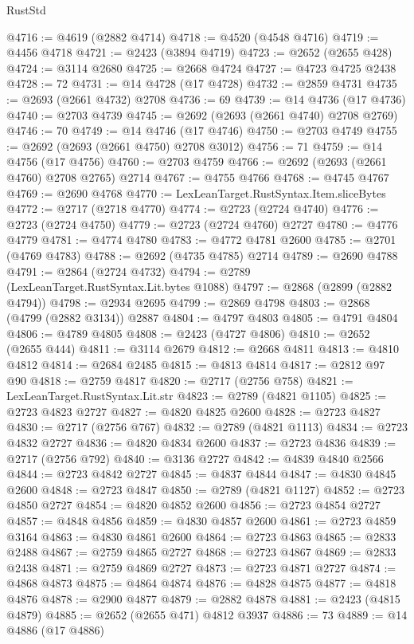 \begin{lexlean}{RustStd}
\begin{coremodule}
@4716 := @4619 (@2882 @4714)
@4718 := @4520 (@4548 @4716)
@4719 := @4456 @4718
@4721 := @2423 (@3894 @4719)
@4723 := @2652 (@2655 @428)
@4724 := @3114 @2680
@4725 := @2668 @4724
@4727 := @4723 @4725 @2438
@4728 := 72
@4731 := @14 @4728 (@17 @4728)
@4732 := @2859 @4731
@4735 := @2693 (@2661 @4732) @2708
@4736 := 69
@4739 := @14 @4736 (@17 @4736)
@4740 := @2703 @4739
@4745 := @2692 (@2693 (@2661 @4740) @2708 @2769)
@4746 := 70
@4749 := @14 @4746 (@17 @4746)
@4750 := @2703 @4749
@4755 := @2692 (@2693 (@2661 @4750) @2708 @3012)
@4756 := 71
@4759 := @14 @4756 (@17 @4756)
@4760 := @2703 @4759
@4766 := @2692 (@2693 (@2661 @4760) @2708 @2765) @2714
@4767 := @4755 @4766
@4768 := @4745 @4767
@4769 := @2690 @4768
@4770 := LexLeanTarget.RustSyntax.Item.sliceBytes
@4772 := @2717 (@2718 @4770)
@4774 := @2723 (@2724 @4740)
@4776 := @2723 (@2724 @4750)
@4779 := @2723 (@2724 @4760) @2727
@4780 := @4776 @4779
@4781 := @4774 @4780
@4783 := @4772 @4781 @2600
@4785 := @2701 (@4769 @4783)
@4788 := @2692 (@4735 @4785) @2714
@4789 := @2690 @4788
@4791 := @2864 (@2724 @4732)
@4794 := @2789 (LexLeanTarget.RustSyntax.Lit.bytes @1088)
@4797 := @2868 (@2899 (@2882 @4794))
@4798 := @2934 @2695
@4799 := @2869 @4798
@4803 := @2868 (@4799 (@2882 @3134)) @2887
@4804 := @4797 @4803
@4805 := @4791 @4804
@4806 := @4789 @4805
@4808 := @2423 (@4727 @4806)
@4810 := @2652 (@2655 @444)
@4811 := @3114 @2679
@4812 := @2668 @4811
@4813 := @4810 @4812
@4814 := @2684 @2485
@4815 := @4813 @4814
@4817 := @2812 @97 @90
@4818 := @2759 @4817
@4820 := @2717 (@2756 @758)
@4821 := LexLeanTarget.RustSyntax.Lit.str
@4823 := @2789 (@4821 @1105)
@4825 := @2723 @4823 @2727
@4827 := @4820 @4825 @2600
@4828 := @2723 @4827
@4830 := @2717 (@2756 @767)
@4832 := @2789 (@4821 @1113)
@4834 := @2723 @4832 @2727
@4836 := @4820 @4834 @2600
@4837 := @2723 @4836
@4839 := @2717 (@2756 @792)
@4840 := @3136 @2727
@4842 := @4839 @4840 @2566
@4844 := @2723 @4842 @2727
@4845 := @4837 @4844
@4847 := @4830 @4845 @2600
@4848 := @2723 @4847
@4850 := @2789 (@4821 @1127)
@4852 := @2723 @4850 @2727
@4854 := @4820 @4852 @2600
@4856 := @2723 @4854 @2727
@4857 := @4848 @4856
@4859 := @4830 @4857 @2600
@4861 := @2723 @4859 @3164
@4863 := @4830 @4861 @2600
@4864 := @2723 @4863
@4865 := @2833 @2488
@4867 := @2759 @4865 @2727
@4868 := @2723 @4867
@4869 := @2833 @2438
@4871 := @2759 @4869 @2727
@4873 := @2723 @4871 @2727
@4874 := @4868 @4873
@4875 := @4864 @4874
@4876 := @4828 @4875
@4877 := @4818 @4876
@4878 := @2900 @4877
@4879 := @2882 @4878
@4881 := @2423 (@4815 @4879)
@4885 := @2652 (@2655 @471) @4812 @3937
@4886 := 73
@4889 := @14 @4886 (@17 @4886)

\end{coremodule}
\end{lexlean}
